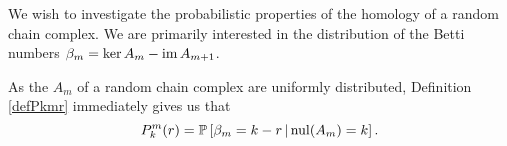 We wish to investigate the probabilistic properties of the homology of a random
chain complex.  We are primarily interested in the distribution of the Betti
numbers $\beta_m = \ker A_m - \operatorname{\mathrm{im}} A_{m+1}$.


\begin{remark}
As the $A_m$ of a random chain complex are uniformly distributed, Definition
\ref{defPkmr} immediately gives us that
\[
  P^m_k(r) = \mathbb{P}\left[\beta_m = k-r \,|\, \mathrm{nul}(A_{m}) = k\right].
\]
\end{remark}





